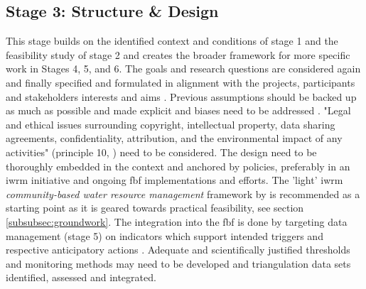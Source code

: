 \subsection{Stage 3: Structure \& Design}\label{subsec:stage3_design}
This stage builds on the identified context and conditions of stage 1 and the feasibility study of stage 2 and creates the broader framework for more specific work in Stages 4, 5, and 6. The goals and research questions are considered again and finally specified and formulated in alignment with the projects, participants and stakeholders interests and aims \autocite{conradReviewCitizenScience2011,minkmanCitizenScienceWater2015}. Previous assumptions should be backed up as much as possible and made explicit \autocite{silvertownNewDawnCitizen2009} and biases need to be addressed \autocite{escaTenPrinciplesCitizen2015,fraislCitizenScienceEnvironmental2022}. "Legal and ethical issues surrounding copyright, intellectual property, data sharing agreements, confidentiality, attribution, and the environmental impact of any activities" (principle 10, \textcite{escaTenPrinciplesCitizen2015}) need to be considered. The design need to be thoroughly embedded in the context and anchored by policies, preferably in an \acrlong{iwrm} initiative \autocite{cervoniImplementingIntegratedWater2008,sharpeCommunityBasedEcological2006} and ongoing \acrshort{fbf} implementations and efforts. The 'light' \acrshort{iwrm} \textit{community-based water resource management} framework by \autocite{dayCommunitybasedWaterResources2009} is recommended as a starting point as it is geared towards practical feasibility, see section \ref{subsubsec:groundwork}. The integration into the \acrshort{fbf} is done by targeting data management (stage 5) on indicators which support intended triggers and respective anticipatory actions \autocite{ifrcCommunityBasedSurveillanceGuiding2017}. Adequate and scientifically justified thresholds and monitoring methods may need to be developed and triangulation data sets identified, assessed and integrated. \newline
